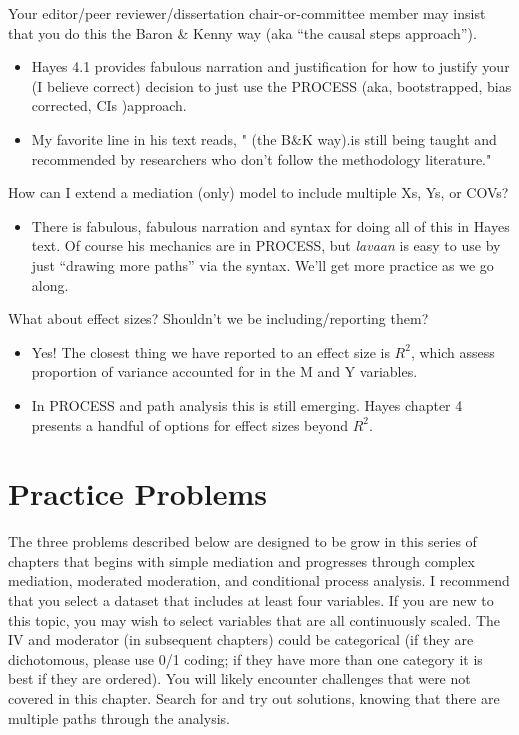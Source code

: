 \documentclass[
  english,
]{book}
\providecommand{\tightlist}{%
  \setlength{\itemsep}{0pt}\setlength{\parskip}{0pt}}
\begin{document}
Your editor/peer reviewer/dissertation chair-or-committee member may insist that you do this the Baron \& Kenny way (aka ``the causal steps approach'').

\begin{itemize}
\tightlist
\item
  Hayes 4.1 \citeyearpar{hayes_introduction_2018} provides fabulous narration and justification for how to justify your (I believe correct) decision to just use the PROCESS (aka, bootstrapped, bias corrected, CIs )approach.
\item
  My favorite line in his text reads, " (the B\&K way).is still being taught and recommended by researchers who don't follow the methodology literature."
\end{itemize}

How can I extend a mediation (only) model to include multiple Xs, Ys, or COVs?

\begin{itemize}
\tightlist
\item
  There is fabulous, fabulous narration and syntax for doing all of this in Hayes text. Of course his mechanics are in PROCESS, but \emph{lavaan} is easy to use by just ``drawing more paths'' via the syntax. We'll get more practice as we go along.
\end{itemize}

What about effect sizes? Shouldn't we be including/reporting them?

\begin{itemize}
\tightlist
\item
  Yes! The closest thing we have reported to an effect size is \(R^2\), which assess proportion of variance accounted for in the M and Y variables.\\
\item
  In PROCESS and path analysis this is still emerging. Hayes chapter 4 presents a handful of options for effect sizes beyond \(R^2\).
\end{itemize}

\hypertarget{practice-problems-5}{%
\section{Practice Problems}\label{practice-problems-5}}

The three problems described below are designed to be grow in this series of chapters that begins with simple mediation and progresses through complex mediation, moderated moderation, and conditional process analysis. I recommend that you select a dataset that includes at least four variables. If you are new to this topic, you may wish to select variables that are all continuously scaled. The IV and moderator (in subsequent chapters) could be categorical (if they are dichotomous, please use 0/1 coding; if they have more than one category it is best if they are ordered). You will likely encounter challenges that were not covered in this chapter. Search for and try out solutions, knowing that there are multiple paths through the analysis.
\end{document}
